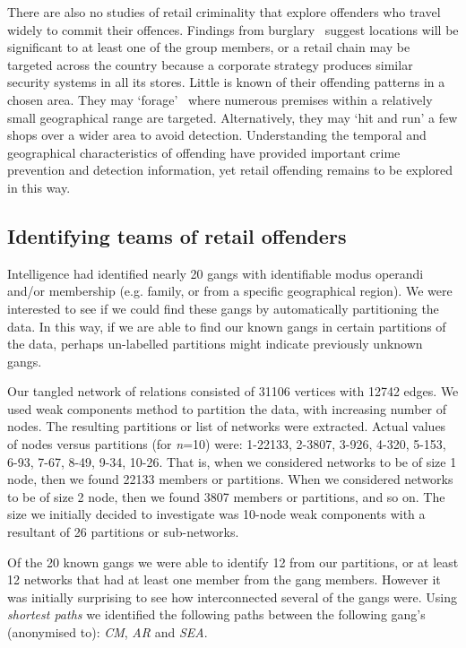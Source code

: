 \documentclass[conference]{IEEEtran}
\theoremstyle{definition}
\begin{document}
There are also no studies of retail criminality that explore
offenders who travel widely to commit their offences.  Findings from
burglary~\cite{Barker2000,EwartOatley2003,EwartOatley2006} suggest
locations will be significant to at least one of the group members, or
a retail chain may be targeted across the country because a corporate
strategy produces similar security systems in all its stores.  Little
is known of their offending patterns in a chosen area.  They may
`forage'~\cite{JohnsonBowers2004} where numerous premises within a
relatively small geographical range are targeted.  Alternatively, they
may `hit and run' a few shops over a wider area to avoid
detection. Understanding the temporal and geographical characteristics
of offending have provided important crime prevention and detection
information, yet retail offending remains to be explored in this way.


\subsection{Identifying teams of retail offenders}\label{sec:identifyteams}
Intelligence had identified nearly 20 gangs with identifiable modus
operandi and/or membership (e.g. family, or from a specific
geographical region). We were interested to see if we could find these
gangs by automatically partitioning the data. In this way, if we are
able to find our known gangs in certain partitions of the data,
perhaps un-labelled partitions might indicate previously unknown
gangs.

Our tangled network of relations consisted of 31106 vertices with
12742 edges. We used weak components method to partition the data,
with increasing number of nodes. The resulting partitions or list of
networks were extracted. Actual values of nodes versus
partitions (for \emph{n}=10) were: 1-22133, 2-3807, 3-926, 4-320,
5-153, 6-93, 7-67, 8-49, 9-34, 10-26. That is, when we considered
networks to be of size 1 node, then we found 22133 members or
partitions. When we considered networks to be of size 2 node, then we
found 3807 members or partitions, and so on. The size we initially
decided to investigate was 10-node weak components with a resultant of
26 partitions or sub-networks.


Of the 20 known gangs we were able to identify 12 from our partitions,
or at least 12 networks that had at least one member from the gang
members. However it was initially surprising to see how interconnected
several of the gangs were. Using \emph{shortest paths} we identified
the following paths between the following gang's (anonymised to):
\emph{CM}, \emph{AR} and \emph{SEA}.
\end{document}
